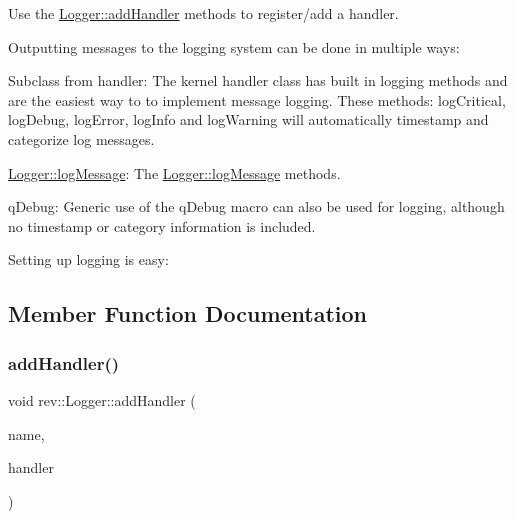 Use the \mbox{\hyperlink{classrev_1_1_logger_a3079f8111b72c4104c9fd23761515646}{Logger\+::add\+Handler}} methods to register/add a handler.

Outputting messages to the logging system can be done in multiple ways\+:


\begin{DoxyItemize}
\item Subclass from handler\+: The kernel handler class has built in logging methods and are the easiest way to to implement message logging. These methods\+: log\+Critical, log\+Debug, log\+Error, log\+Info and log\+Warning will automatically timestamp and categorize log messages.
\item \mbox{\hyperlink{classrev_1_1_logger_a4d30225c80b39e4ff5e9e77640994e1c}{Logger\+::log\+Message}}\+: The \mbox{\hyperlink{classrev_1_1_logger_a4d30225c80b39e4ff5e9e77640994e1c}{Logger\+::log\+Message}} methods.
\item q\+Debug\+: Generic use of the q\+Debug macro can also be used for logging, although no timestamp or category information is included.
\end{DoxyItemize}

Setting up logging is easy\+: 
\begin{DoxyCode}{0}
\end{DoxyCode}
 

\subsection{Member Function Documentation}
\mbox{\label{classrev_1_1_logger_a3079f8111b72c4104c9fd23761515646}} 
\subsubsection{\texorpdfstring{addHandler()}{addHandler()}}
{\footnotesize\ttfamily void rev\+::\+Logger\+::add\+Handler (\begin{DoxyParamCaption}\item[{const \mbox{\hyperlink{classrev_1_1_g_string}{G\+String}} \&}]{name,  }\item[{\mbox{\hyperlink{classrev_1_1_abstract_log_handler}{Abstract\+Log\+Handler}} $\ast$}]{handler }\end{DoxyParamCaption})}



